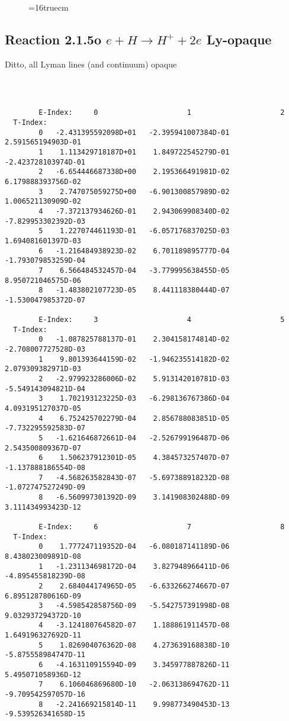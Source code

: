 \documentclass[12pt,dvipdfmx]{article}
\begin{document}
\begin{figure} \label{2.1.5iFU}
\epsfxsize=16truecm
\end{figure}
\newpage


\subsection{
Reaction 2.1.5o $ e + H \rightarrow H^+ + 2e $  Ly-opaque}


Ditto, all Lyman lines (and continuum) opaque


\begin{small}\begin{verbatim}



        E-Index:     0                     1                     2
  T-Index:
        0   -2.431395592098D+01   -2.395941007384D-01    2.591565194903D-01
        1    1.113429718187D+01    1.849722545279D-01   -2.423728103974D-01
        2   -6.654446687338D+00    2.195366491981D-02    6.179888393756D-02
        3    2.747075059275D+00   -6.901300857989D-02    1.006521130909D-02
        4   -7.372137934626D-01    2.943069908340D-02   -7.829953302392D-03
        5    1.227074461193D-01   -6.057176837025D-03    1.694081601397D-03
        6   -1.216484938923D-02    6.701189895777D-04   -1.793079853259D-04
        7    6.566484532457D-04   -3.779995638455D-05    8.950721046575D-06
        8   -1.483802107723D-05    8.441118380444D-07   -1.530047985372D-07

        E-Index:     3                     4                     5
  T-Index:
        0   -1.087825788137D-01    2.304158174814D-02   -2.708007727528D-03
        1    9.801393644159D-02   -1.946235514182D-02    2.079309382971D-03
        2   -2.979923286006D-02    5.913142010781D-03   -5.549143094821D-04
        3    1.702193123225D-03   -6.298136767386D-04    4.093195127037D-05
        4    6.752425702279D-04    2.856788083851D-05   -7.732295592583D-07
        5   -1.621646872661D-04   -2.526799196487D-06    2.543500809367D-07
        6    1.506237912301D-05    4.384573257407D-07   -1.137888186554D-08
        7   -4.568263582843D-07   -5.697388918232D-08   -1.072747527249D-09
        8   -6.560997301392D-09    3.141908302488D-09    3.111434993423D-12

        E-Index:     6                     7                     8
  T-Index:
        0    1.777247119352D-04   -6.080187141189D-06    8.438023009891D-08
        1   -1.231134698172D-04    3.827948966411D-06   -4.895455818239D-08
        2    2.684044174965D-05   -6.633266274667D-07    6.895128780616D-09
        3   -4.598542858756D-09   -5.542757391998D-08    9.032937294372D-10
        4   -3.124180764582D-07    1.188861911457D-08    1.649196327692D-11
        5    1.826904076362D-08    4.273639168838D-10   -5.875558984747D-11
        6   -4.163110915594D-09    3.345977887826D-11    5.495071058936D-12
        7    6.106046869680D-10   -2.063138694762D-11   -9.709542597057D-16
        8   -2.241669215814D-11    9.998773490453D-13   -9.539526341658D-15


\end{verbatim}
\end{small}
\end{document}
